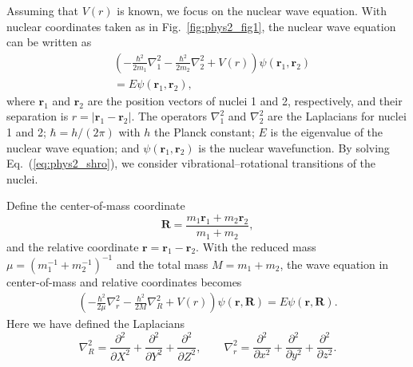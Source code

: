 Assuming that $V(r)$ is known, we focus on the nuclear wave equation.  
With nuclear coordinates taken as in Fig.~\ref{fig:phys2_fig1}, the nuclear wave equation can be written as
\begin{align}
\label{eq:phys2_shro}
&\left( - \frac{\hbar^2}{2 m_1} \nabla_{1}^2  - \frac{\hbar^2}{2 m_2} \nabla_{2}^2 + V(r) \right) \psi(\boldsymbol{r}_1, \boldsymbol{r}_2) \nonumber \\
&= E \psi(\boldsymbol{r}_1, \boldsymbol{r}_2),
\end{align}
where $\boldsymbol{r}_1$ and $\boldsymbol{r}_2$ are the position vectors of nuclei 1 and 2, respectively, and their separation is $r = |\boldsymbol{r}_1 - \boldsymbol{r}_2|$. The operators $\nabla_{1}^2$ and $\nabla_{2}^2$ are the Laplacians for nuclei 1 and 2; $\hbar = h/(2\pi)$ with $h$ the Planck constant; $E$ is the eigenvalue of the nuclear wave equation; and $\psi(\boldsymbol{r}_1, \boldsymbol{r}_2)$ is the nuclear wavefunction. By solving Eq.~(\ref{eq:phys2_shro}), we consider vibrational–rotational transitions of the nuclei.

Define the center-of-mass coordinate
\[
\boldsymbol{R} = \frac{m_1 \boldsymbol{r}_1 + m_2 \boldsymbol{r}_2}{m_1 + m_2},
\]
and the relative coordinate $\boldsymbol{r} = \boldsymbol{r}_1 - \boldsymbol{r}_2$.  
With the reduced mass $\mu = (m_1^{-1} + m_2^{-1})^{-1}$ and the total mass $M = m_1 + m_2$, the wave equation in center-of-mass and relative coordinates becomes
\begin{align}
\label{eq:com_each}
\left( - \frac{\hbar^2}{2 \mu} \nabla_{r}^2  - \frac{\hbar^2}{2 M} \nabla_{R}^2 + V(r) \right) \psi(\boldsymbol{r},\boldsymbol{R}) = E \psi(\boldsymbol{r},\boldsymbol{R}).
\end{align}
Here we have defined the Laplacians
\[
\nabla^2_{R} = \frac{\partial^2}{\partial X^2} +  \frac{\partial^2}{\partial Y^2} +  \frac{\partial^2}{\partial Z^2}, \qquad
\nabla^2_{r} = \frac{\partial^2}{\partial x^2} +  \frac{\partial^2}{\partial y^2} +  \frac{\partial^2}{\partial z^2}.
\]

